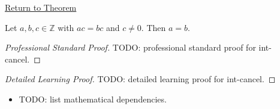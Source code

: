 \newpage
{}
\label{prf:int-cancel}

\begin{remark*}[Return]
\hyperref[cor:int-cancel]{Return to Theorem}
\end{remark*}

\begin{corollary*}
Let $a, b, c \in \mathbb{Z}$ with $ac = bc$ and $c \neq 0$. Then $a = b$.
\end{corollary*}

\begin{proof}[Professional Standard Proof]
\LRAProofBodyStart
TODO: professional standard proof for int-cancel.
\end{proof}

\begin{proof}[Detailed Learning Proof]
\LRAProofBodyStart
TODO: detailed learning proof for int-cancel.
\end{proof}

\begin{remark*}
\end{remark*}

\begin{dependencies}
\begin{itemize}
  \item TODO: list mathematical dependencies.
\end{itemize}
\end{dependencies}

\clearpage
